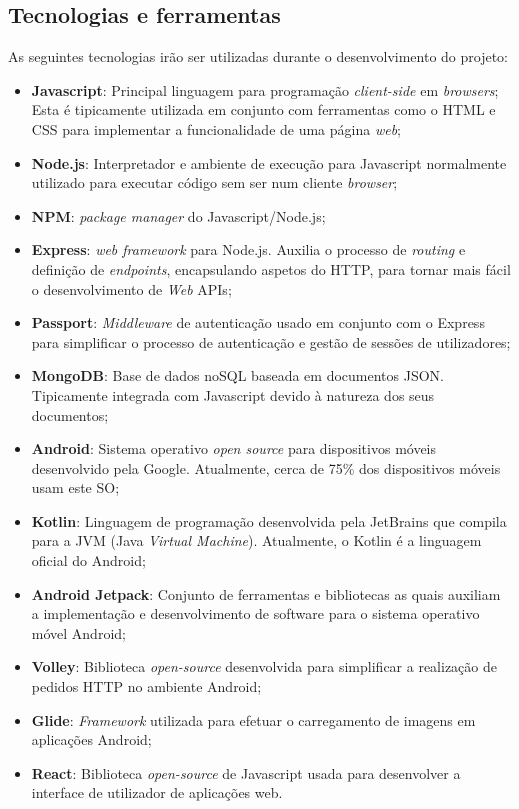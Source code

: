 \subsection{Tecnologias e ferramentas}
As seguintes tecnologias irão ser utilizadas durante o desenvolvimento do projeto:
\begin{itemize}
	\item \textbf{Javascript}: Principal linguagem para programação \textit{client-side} em \textit{browsers}; Esta é tipicamente utilizada em conjunto com ferramentas como o HTML e CSS para implementar a funcionalidade de uma página \textit{web};
	\item \textbf{Node.js}: Interpretador e ambiente de execução para Javascript normalmente utilizado para executar código sem ser num cliente \textit{browser};
	\item \textbf{NPM}: \textit{package manager} do Javascript/Node.js;
	\item \textbf{Express}: \textit{web framework} para Node.js. Auxilia o processo de \textit{routing} e definição de \textit{endpoints}, encapsulando aspetos do HTTP, para tornar mais fácil o desenvolvimento de \textit{Web} APIs;
	\item \textbf{Passport}: \textit{Middleware} de autenticação usado em conjunto com o Express para simplificar o processo de autenticação e gestão de sessões de utilizadores;
	\item \textbf{MongoDB}: Base de dados noSQL baseada em documentos JSON. Tipicamente integrada com Javascript devido à natureza dos seus documentos;
	\item \textbf{Android}: Sistema operativo \textit{open source} para dispositivos móveis desenvolvido pela Google. Atualmente, cerca de 75\% dos dispositivos móveis usam este SO;
	\item \textbf{Kotlin}: Linguagem de programação desenvolvida pela JetBrains que compila para a JVM (Java \textit{Virtual Machine}). Atualmente, o Kotlin é a linguagem oficial do Android;
	\item \textbf{Android Jetpack}: Conjunto de ferramentas e bibliotecas as quais auxiliam a implementação e desenvolvimento de software para o sistema operativo móvel Android;
	\item \textbf{Volley}: Biblioteca \textit{open-source} desenvolvida para simplificar a realização de pedidos HTTP no ambiente Android;
	\item \textbf{Glide}: \textit{Framework} utilizada para efetuar o carregamento de imagens em aplicações Android;
	\item \textbf{React}: Biblioteca \textit{open-source} de Javascript usada para desenvolver a interface de utilizador de aplicações web.
\end{itemize}